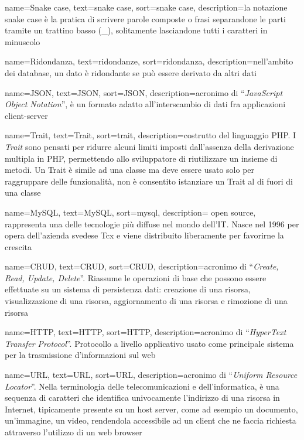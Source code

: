 {
    name=Snake case, %
    text=snake case, %
    sort=snake case,
    description={la notazione snake case è la pratica di scrivere parole composte o frasi separandone le parti tramite un trattino basso (\_), solitamente lasciandone tutti i caratteri in minuscolo}
}

{
    name=Ridondanza, %
    text=ridondanze, %
    sort=ridondanza,
    description={nell'ambito dei database, un dato è ridondante se può essere derivato da altri dati}
}

{
    name=JSON, %
    text=JSON, %
    sort=JSON,
    description={acronimo di “\emph{JavaScript Object Notation}”, è un formato adatto all'interscambio di dati fra applicazioni client-server}
}

{
    name=Trait, %
    text=Trait, %
    sort=trait,
    description={costrutto del linguaggio PHP. I \emph{Trait} sono pensati per ridurre alcuni limiti imposti dall'assenza della derivazione multipla in PHP, permettendo allo sviluppatore di riutilizzare un insieme di metodi. Un Trait è simile ad una classe ma deve essere usato solo per raggruppare delle funzionalità, non è consentito istanziare un Trait al di fuori di una classe }
}

{
    name=MySQL, %
    text=MySQL, %
    sort=mysql,
    description={ open source, rappresenta una delle tecnologie più diffuse nel mondo dell'IT. Nasce nel 1996 per opera dell’azienda svedese Tcx e viene distribuito liberamente per favorirne la crescita}
}

{
    name=CRUD, %
    text=CRUD, %
    sort=CRUD,
    description={acronimo di “\emph{Create, Read, Update, Delete}”. Riassume le operazioni di base che possono essere effettuate su un sistema di persistenza dati: creazione di una risorsa, visualizzazione di una risorsa, aggiornamento di una risorsa e rimozione di una risorsa}
}

{
    name=HTTP, %
    text=HTTP, %
    sort=HTTP,
    description={acronimo di “\emph{HyperText Transfer Protocol}”. Protocollo a livello applicativo usato come principale sistema per la trasmissione d'informazioni sul web}
}

{
    name=URL, %
    text=URL, %
    sort=URL,
    description={acronimo di “\emph{Uniform Resource Locator}”. Nella terminologia delle telecomunicazioni e dell'informatica, è una sequenza di caratteri che identifica univocamente l'indirizzo di una risorsa in Internet, tipicamente presente su un host server, come ad esempio un documento, un'immagine, un video, rendendola accessibile ad un client che ne faccia richiesta attraverso l'utilizzo di un web browser}
}







